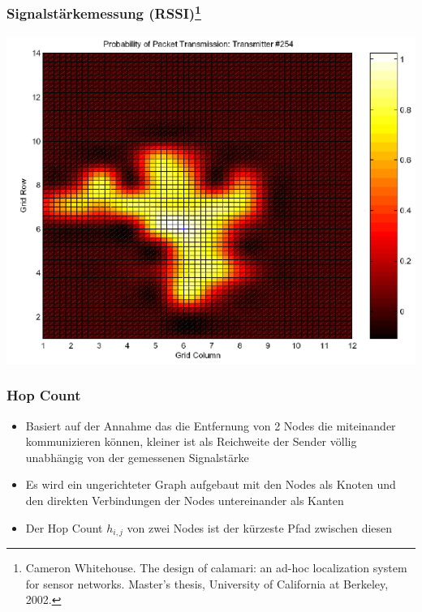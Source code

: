 \begin{frame}
\frametitle{Signalstärkemessung (RSSI)\footnote{Cameron Whitehouse. The design of calamari: an ad-hoc localization
system for sensor networks. Master’s thesis, University of California at
Berkeley, 2002.}}
  \begin{center}
  \includegraphics[scale=0.5]{img/RSSI1}
  \end{center}
\end{frame}

\begin{frame}
\frametitle{Hop Count}

\begin{itemize}
  \item Basiert auf der Annahme das die Entfernung von 2 Nodes die
    miteinander kommunizieren können, kleiner ist als Reichweite der
    Sender völlig unabhängig von der gemessenen Signalstärke
  \item Es wird ein ungerichteter Graph aufgebaut mit den Nodes als
    Knoten und den direkten Verbindungen der Nodes untereinander als
    Kanten
  \item Der Hop Count $h_{i,j}$ von zwei Nodes ist der kürzeste Pfad
    zwischen diesen
\end{itemize}
\end{frame}

